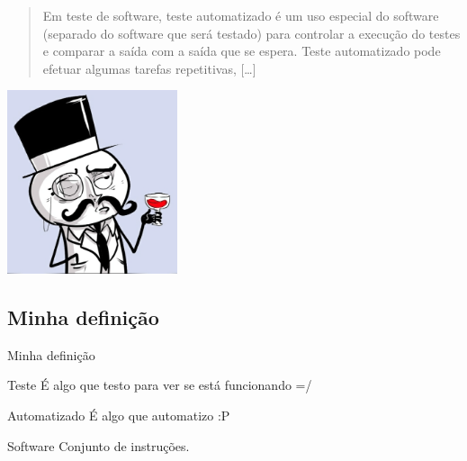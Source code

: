\documentclass[]{beamer}
\begin{document}
  \begin{frame}{\subsecname}
    \blockquote[{\cite[Wikipedia]{_test_2014}}]{
      Em teste de software, teste automatizado é um uso especial do software
      (separado do software que será testado) para controlar a execução do testes
      e comparar a saída com a saída que se espera. Teste automatizado pode
      efetuar algumas tarefas repetitivas, [\ldots]
    }
  \end{frame}

  \begin{frame}{}
    \begin{center}
      \includegraphics[width=5cm]{images/like-a-sir}
    \end{center}
  \end{frame}


  \subsection*{Minha definição}

  \begin{frame}
    \begin{center}
      \Huge Minha definição
    \end{center}
  \end{frame}

  \begin{frame}[label=minha-definicao]{\subsecname}
    \begin{block}{Teste}
      É algo que testo para ver se está funcionando =/
    \end{block}
    \pause

    \begin{block}{Automatizado}
      É algo que automatizo :P
    \end{block}
    \pause

    \begin{block}{Software}
      Conjunto de instruções.
    \end{block}
  \end{frame}
\end{document}

